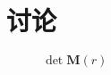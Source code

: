\section{讨论}

\begin{figure}[H]
    \centering
    
    \caption{$\det \pmb{M}(r)$}
    \label{fig:det_M_r_far}
\end{figure}
